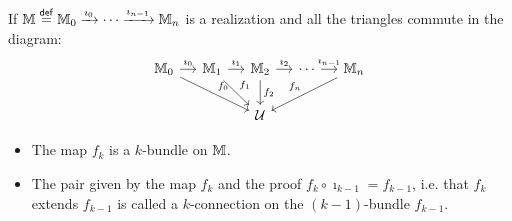 \documentclass[14pt,aspectratio=169]{beamer}
\renewcommand{\defemph}[1]{\alert{#1}}
\begin{document}
\begin{frame}
\begin{definition}
If \( \mathbb{M}\stackrel{\mathsf{def}}{=} \mathbb{M}_0\xrightarrow[]{\imath_0}\cdots\xrightarrow[]{\imath_{n-1}}\mathbb{M}_n \) is a realization and all the triangles commute in the diagram:\vspace{-10pt}
\[\begin{tikzcd}[ampersand replacement=\&, column sep=small]
  {\mm_0} \& {\mm_1} \& {\mm_2} \& \cdots \& {\mm_n} \\
\&\& {\mathcal{U}}
\arrow["{\imath_0}", from=1-1, to=1-2]
\arrow["{f_0}", from=1-1, to=2-3]
\arrow["{\imath_1}", from=1-2, to=1-3]
\arrow["{f_1}", from=1-2, to=2-3]
\arrow["{\imath_2}", from=1-3, to=1-4]
\arrow["{f_2}", from=1-3, to=2-3]
\arrow["{\imath_{n-1}}", from=1-4, to=1-5]
\arrow["f_n"', from=1-5, to=2-3]
\end{tikzcd}\]\vspace{-15pt}
\begin{itemize}
\item The map \( f_k \) is a \defemph{\( k \)-bundle} on \( \mathbb{M} \).
\item The pair given by the map \( f_k \) and the proof \( f_k\circ \imath_{k-1}=f_{k-1} \), i.e. that \( f_k \) extends \( f_{k-1} \) is called a \defemph{\( k \)-connection on the \( (k-1) \)-bundle \( f_{k-1} \)}.
\end{itemize}
\end{definition}
\end{frame}
\end{document}
